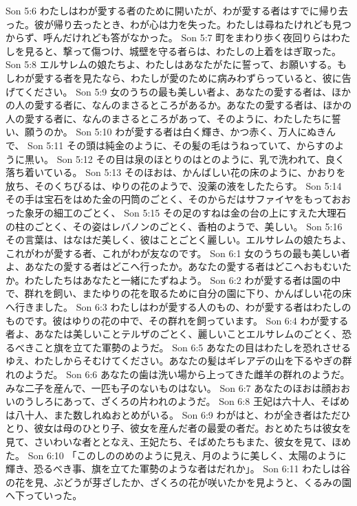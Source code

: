 Son 5:6  わたしはわが愛する者のために開いたが、わが愛する者はすでに帰り去った。彼が帰り去ったとき、わが心は力を失った。わたしは尋ねたけれども見つからず、呼んだけれども答がなかった。
Son 5:7  町をまわり歩く夜回りらはわたしを見ると、撃って傷つけ、城壁を守る者らは、わたしの上着をはぎ取った。
Son 5:8  エルサレムの娘たちよ、わたしはあなたがたに誓って、お願いする。もしわが愛する者を見たなら、わたしが愛のために病みわずらっていると、彼に告げてください。
Son 5:9  女のうちの最も美しい者よ、あなたの愛する者は、ほかの人の愛する者に、なんのまさるところがあるか。あなたの愛する者は、ほかの人の愛する者に、なんのまさるところがあって、そのように、わたしたちに誓い、願うのか。
Son 5:10  わが愛する者は白く輝き、かつ赤く、万人にぬきんで、
Son 5:11  その頭は純金のように、その髪の毛はうねっていて、からすのように黒い。
Son 5:12  その目は泉のほとりのはとのように、乳で洗われて、良く落ち着いている。
Son 5:13  そのほおは、かんばしい花の床のように、かおりを放ち、そのくちびるは、ゆりの花のようで、没薬の液をしたたらす。
Son 5:14  その手は宝石をはめた金の円筒のごとく、そのからだはサファイヤをもっておおった象牙の細工のごとく、
Son 5:15  その足のすねは金の台の上にすえた大理石の柱のごとく、その姿はレバノンのごとく、香柏のようで、美しい。
Son 5:16  その言葉は、はなはだ美しく、彼はことごとく麗しい。エルサレムの娘たちよ、これがわが愛する者、これがわが友なのです。
Son 6:1  女のうちの最も美しい者よ、あなたの愛する者はどこへ行ったか。あなたの愛する者はどこへおもむいたか。わたしたちはあなたと一緒にたずねよう。
Son 6:2  わが愛する者は園の中で、群れを飼い、またゆりの花を取るために自分の園に下り、かんばしい花の床へ行きました。
Son 6:3  わたしはわが愛する人のもの、わが愛する者はわたしのものです。彼はゆりの花の中で、その群れを飼っています。
Son 6:4  わが愛する者よ、あなたは美しいことテルザのごとく、麗しいことエルサレムのごとく、恐るべきこと旗を立てた軍勢のようだ。
Son 6:5  あなたの目はわたしを恐れさせるゆえ、わたしからそむけてください。あなたの髪はギレアデの山を下るやぎの群れのようだ。
Son 6:6  あなたの歯は洗い場から上ってきた雌羊の群れのようだ。みな二子を産んで、一匹も子のないものはない。
Son 6:7  あなたのほおは顔おおいのうしろにあって、ざくろの片われのようだ。
Son 6:8  王妃は六十人、そばめは八十人、また数しれぬおとめがいる。
Son 6:9  わがはと、わが全き者はただひとり、彼女は母のひとり子、彼女を産んだ者の最愛の者だ。おとめたちは彼女を見て、さいわいな者ととなえ、王妃たち、そばめたちもまた、彼女を見て、ほめた。
Son 6:10  「このしののめのように見え、月のように美しく、太陽のように輝き、恐るべき事、旗を立てた軍勢のような者はだれか」。
Son 6:11  わたしは谷の花を見、ぶどうが芽ざしたか、ざくろの花が咲いたかを見ようと、くるみの園へ下っていった。
